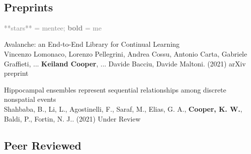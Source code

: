 \documentclass[10pt]{cooperCV2}
\begin{document}
%	






\needspace{\headerpush}
\myRule{\columnwidth}{1pt}\\


 
 
	

\subsection{Preprints} 
\textcolor{grey}{**stars** = mentee; \textbf{bold} = me}\\
\begin{etaremune}[itemindent=-1.5\bibhang, topsep=0pt,
				   itemsep=\bibsep,partopsep=0pt,parsep=0pt,leftmargin={\bibhang+\widthof{[999]}}] 
    
    \item Avalanche: an End-to-End Library for Continual Learning \\
     Vincenzo Lomonaco, Lorenzo Pellegrini, Andrea Cossu, Antonio Carta, Gabriele Graffieti, ... \textbf{Keiland Cooper}, ... Davide Bacciu, Davide Maltoni. (2021) arXiv preprint 
     
	
    \item Hippocampal ensembles represent sequential relationships among discrete nonspatial events \\
     Shahbaba, B., Li, L., Agostinelli, F., Saraf, M., Elias, G. A., \textbf{Cooper, K. W.}, Baldi, P.,  Fortin, N. J.. (2021) Under Review 
     
	

\end{etaremune}

 

	

\subsection{Peer Reviewed} 
\end{document}
